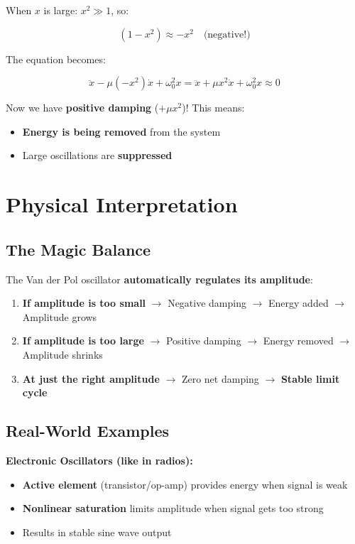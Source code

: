 \documentclass{article}
\begin{document}
When $x$ is large: $x^2 \gg 1$, so:

\begin{equation}
(1 - x^2) \approx -x^2 \quad \text{(negative!)}
\end{equation}

The equation becomes:

\begin{equation}
\ddot{x} - \mu(-x^2)\dot{x} + \omega_0^2 x = \ddot{x} + \mu x^2\dot{x} + \omega_0^2 x \approx 0
\end{equation}

Now we have \textbf{positive damping} ($+\mu x^2$)! This means:
\begin{itemize}
    \item \textbf{Energy is being removed} from the system
    \item Large oscillations are \textbf{suppressed}
\end{itemize}

\section{Physical Interpretation}

\subsection{The Magic Balance}

The Van der Pol oscillator \textbf{automatically regulates its amplitude}:

\begin{enumerate}
    \item \textbf{If amplitude is too small} $\rightarrow$ Negative damping $\rightarrow$ Energy added $\rightarrow$ Amplitude grows
    \item \textbf{If amplitude is too large} $\rightarrow$ Positive damping $\rightarrow$ Energy removed $\rightarrow$ Amplitude shrinks
    \item \textbf{At just the right amplitude} $\rightarrow$ Zero net damping $\rightarrow$ \textbf{Stable limit cycle}
\end{enumerate}

\subsection{Real-World Examples}

\textbf{Electronic Oscillators (like in radios):}
\begin{itemize}
    \item \textbf{Active element} (transistor/op-amp) provides energy when signal is weak
    \item \textbf{Nonlinear saturation} limits amplitude when signal gets too strong
    \item Results in stable sine wave output
\end{itemize}
\end{document}
